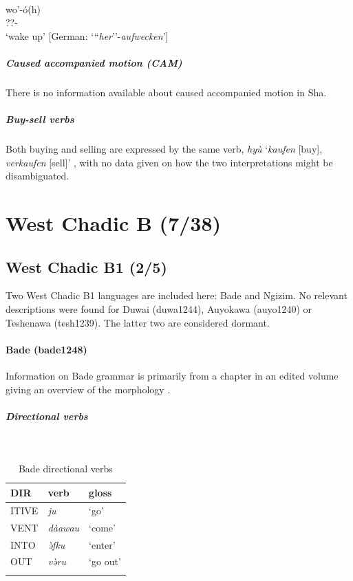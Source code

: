 \ex\label{ex2:shaa4}
 \\
\gll wo'-ó(h) \\
??- \\
\glt `wake up' [German: `{``}\textit{her}''-\textit{aufwecken}']
\z 

\subparagraph{Caused accompanied motion (CAM)}



There is no information available about caused accompanied motion in Sha. 

\subparagraph{Buy-sell verbs}



Both buying and selling are expressed by the same verb, \textit{hyù} `\textit{kaufen} [buy], \textit{verkaufen} [sell]' \citep[292, 294]{jungraithmayrRonSprachenTaschadohamitischeStudien1970}, with no data given on how the two interpretations might be disambiguated. 

\section{West Chadic B (7/38)}

\subsection{West Chadic B1 (2/5)}

Two West Chadic B1 languages are included here: Bade and Ngizim. No relevant descriptions were found for Duwai (duwa1244), Auyokawa (auyo1240) or Teshenawa (tesh1239). The latter two are considered dormant. 

\paragraph*{Bade (bade1248)} \label{bade} Information on Bade grammar is primarily from a chapter in an edited volume giving an overview of the morphology \citep[]{schuhBadeMorphology2007}. 

\subparagraph{Directional verbs}~



\begin{table}[H]
	\caption{Bade directional verbs} 
	\label{tab:badeV}
	\begin{tabular}{lll} %
		\lsptoprule
		DIR & verb & gloss   \\ %
		\midrule
		ITIVE & \textit{ju} & `go' \\
		VENT & \textit{dàawau} & `come' \\
		INTO& \textit{ə̀fku} & `enter' \\
		OUT & \textit{və̀ru} & `go out' \\
		\lspbottomrule
	\end{tabular}
\end{table}

